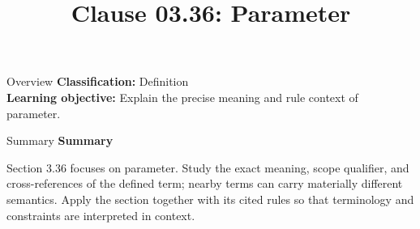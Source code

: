 \documentclass[10pt,letterpaper]{article}
\title{Clause 03.36: Parameter}
\author{}
\date{}
\begin{document}
\maketitle
\begin{CornellOverviewBox}{Overview}
\textbf{Classification:} Definition\\[2pt]
\textbf{Learning objective:} Explain the precise meaning and rule context of parameter.
\end{CornellOverviewBox}\begin{CornellSummaryBox}{Summary}
{\sffamily\bfseries\color{Accent} Summary}\par\vspace{3pt}Section 3.36 focuses on parameter. Study the exact meaning, scope qualifier, and cross-references of the defined term; nearby terms can carry materially different semantics. Apply the section together with its cited rules so that terminology and constraints are interpreted in context.
\end{CornellSummaryBox}
\end{document}
